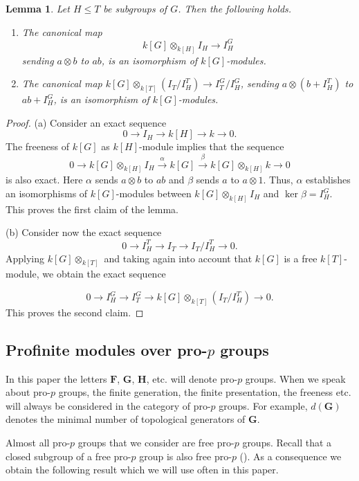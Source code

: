 \documentclass[11pt]{amsart}
\newtheorem{lem}{Lemma}[section]
\numberwithin{claimcounter}{lem}
\begin{document}
\begin{lem} \label{isomdiscr} Let $H\le T$ be      subgroups of $G$. Then the following holds.
\begin{enumerate}
\item[(a)] The canonical map $$k[G]\otimes_{k[H]} I_H\to I_H^G$$ sending  $a\otimes b$ to $ab$, is an isomorphism of $k[G]$-modules.

\item [(b)] The canonical map  $k[G]\otimes_{k[T]} (I_T/I_H^T) \to I_T^G/I_H^G $, sending $a\otimes (b+I_H^T)$ to $ab+I_H^G$, is an isomorphism of $k[G]$-modules.


\end{enumerate}

\end{lem}
\begin{proof}
(a) Consider an exact sequence
$$0\to I_H\to k[H]\to k \to 0.$$
The freeness of $k[G]$ as  $k[H]$-module implies that the sequence 
$$0\to k[G] \otimes_{k[H]} I_H\xrightarrow{\alpha}k[G]\xrightarrow{\beta} k[G] \otimes_{k[H]} k\to 0$$
 is also exact.  Here $\alpha$  sends $a\otimes b$ to $ab$ and $\beta$ sends $a$ to $a\otimes 1$. Thus, $\alpha$ establishes an isomorphisms of $k[G]$-modules
between $k[G]\otimes_{k[H]} I_H$ and $\ker \beta= I_H^G$.     This proves the first claim of the lemma.
 
 (b) Consider now the exact sequence
$$0\to I_H^T\to I_T\to I_T/I_H^T\to 0.$$ Applying $k[G] \otimes_{k[T]}$ and taking   again into account that $ k[G]$ is a free   $k[T]$-module, we obtain the exact sequence

$$0\to I_H^G\to I_T^G\to k[G] \otimes_{k[T]}( I_T/I_H^T)\to 0.$$ 
 This proves the second claim.
 \end{proof}
 
 \subsection{Profinite modules over pro-$p$ groups}

In this paper the letters $\mathbf F$, $\mathbf G$, $\mathbf H$, etc. will denote    pro-$p$ groups. When we speak about pro-$p$ groups, the finite generation,  the finite presentation, the freeness etc.  will always be considered in the category of pro-$p$ groups. For example, $d(\mathbf G)$ denotes the minimal number of topological generators of $\mathbf G$.


Almost all pro-$p$ groups that we consider are free pro-$p$ groups. Recall that a closed subgroup of a free pro-$p$ group is also free pro-$p$ (\cite[Corollary 7.7.5]{RZ10}). As a consequence we obtain the following result which we will  use often in this paper.
\end{document}
